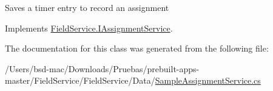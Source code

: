 Saves a timer entry to record an assignment 



Implements \hyperlink{interface_field_service_1_1_i_assignment_service_ab10e11786b78d7f21cf9a40482336109}{Field\+Service.\+I\+Assignment\+Service}.



The documentation for this class was generated from the following file\+:\begin{DoxyCompactItemize}
\item 
/\+Users/bsd-\/mac/\+Downloads/\+Pruebas/prebuilt-\/apps-\/master/\+Field\+Service/\+Field\+Service/\+Data/\hyperlink{_sample_assignment_service_8cs}{Sample\+Assignment\+Service.\+cs}\end{DoxyCompactItemize}
